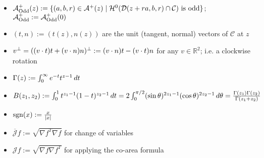 \documentclass{article}
\newcommand{\haus}[2]{\mathcal{H}^{#1}\parens{#2}}
\newcommand{\R}[1]{\mathbb{R}^{#1}}
\newcommand{\optparens}[1]{\ifthenelse{\equal{#1}{}}{}{\parens{#1}}}
\newcommand{\D}[1]{\mathcal{D}\optparens{#1}}
\newcommand{\A}{\mathcal{A}^{+}}
\newcommand{\Ao}{\A_{\textup{Odd}}}
\newcommand{\C}{\mathcal{C}}
\newcommand{\B}[1]{B\parens{#1}}
\newcommand{\G}[1]{\Gamma\parens{#1}}
\newcommand{\sgn}[1]{\mathrm{sgn}\parens{#1}}
\newcommand{\J}[1]{\mathcal{J}{#1}}
\newcommand{\JJ}[1]{\overline{\mathcal{J}}{#1}}
\renewcommand{\dot}[2]{{#1}\cdot{#2}}
\newcommand{\pdot}[2]{\parens{\dot{#1}{#2}}}
\begin{document}
\begin{itemize}
  \item $\Ao \parens{z} := \braces{\parens{a, b, r} \in \A{}\parens{z} \mid \haus{0}{\D{z + ra, b, r} \cap \C} \text{ is odd}}$; $\Ao := \Ao\parens{0}$
  \item $(t, n) := (t(z), n(z))$ are the unit (tangent, normal) vectors of $\C$ at $z$
  \item $v^\perp = \parens{\pdot{v}{t}t + \pdot{v}{n}n}^\perp := \pdot{v}{n} t - \pdot{v}{t} n$ for any $v \in \R{2}$; i.e. a clockwise rotation
  \item $\G{z} := \int_0^\infty e^{-t} t^{z-1} \, dt$
  \item $\B{z_1, z_2} := \int_0^1 t^{z_1 -1} \parens{1-t}^{z_2-1} \, dt = 2\int_0^{\pi / 2} \parens{\sin \theta}^{2z_1 - 1} \parens{\cos \theta}^{2z_2 - 1} \, d\theta = \frac{\G{z_1}\G{z_2}}{\G{z_1+z_2}}$
  \item $\sgn{x} := \frac{x}{\abs{x}}$
  \item $\JJ{f} := \sqrt{\nabla f^T \nabla f}$ for change of variables
  \item $\J{f} := \sqrt{\nabla f \nabla f^T}$ for applying the co-area formula
\end{itemize}

\newpage
\end{document}
